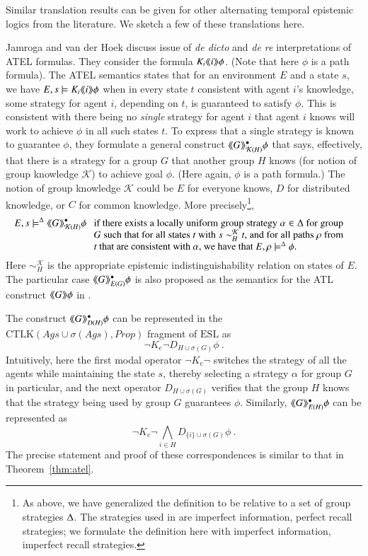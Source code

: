 \documentclass[a4wide]{article}
\newcommand{\CTLK}{\mbox{CTLK}}
\newcommand{\ESL}{\mbox{ESL}}
\newcommand{\Prop}{Prop}
\theoremstyle{examplesty}
\newcommand{\strat}{\sigma}
\newcommand{\Ags}{\mathit{Ags}}
\newcommand{\atlop}[1]{\langle\hspace{-2pt}\langle #1 \rangle \hspace{-2pt}\rangle }
\begin{document}
Similar  translation results can be given for other alternating temporal epistemic logics from the literature. 
We sketch a few of these translations here. 

Jamroga and van der Hoek \cite{JvdH2004} 
discuss issue of \emph{de dicto} and \emph{de re} interpretations of ATEL formulas. They 
consider the formula $K_i\atlop{i} \phi$. 
(Note that here $\phi$ is a path formula). 
The ATEL semantics states that for an environment $E$ and a state 
$s$, we have $E, s\models K_i\atlop{i} \phi$ when in every state $t$ consistent with agent $i$'s knowledge, some strategy for agent $i$, depending on $t$, is guaranteed 
to satisfy $\phi$. This is consistent with there being no  \emph{single} strategy for agent $i$ that agent $i$ knows will work to achieve $\phi$
in all such states $t$. To express that a single strategy is known to guarantee $\phi$, 
they formulate a general construct $\atlop{G}^\bullet_{\mathcal{ K}(H)}\phi$ that says, effectively, that there is a strategy  for a group $G$ that another group $H$
knows (for notion of group knowledge $\mathcal{ K}$) to achieve goal $\phi$. 
(Here again, $\phi$ is a path formula.)
The notion of group knowledge $\mathcal{ K}$ could be $E$ for everyone knows, $D$ for  distributed knowledge, or $C$ for common knowledge. 
More precisely\footnote{As above, we have generalized the definition to be relative to a set of group strategies $\Delta$.
The strategies used in \cite{JvdH2004} are imperfect information, perfect recall strategies; we formulate the definition here with imperfect information, imperfect recall strategies.}, 
\begin{align*}
E, s\models^\GStrats 
\atlop{G}^\bullet_{\mathcal{ K}(H)}\phi 
&~~~ \parbox[t]{3.5in}{if there exists a 
locally 
uniform 
group strategy $\alpha\in \GStrats$ 
for group $G$
such that for all states $t$ with $s \sim_H^\mathcal{ K} t$, 
and  for all paths $\rho$ from $t$ that are consistent with $\alpha$, 
we have that $E,\rho \models^\GStrats \phi$.
} 
\end{align*} 
Here $\sim^\mathcal{ K}_H$ is the appropriate epistemic indistinguishability relation on states of $E$. 
The particular case $\atlop{G}^\bullet_{E(G)}\phi$ is also proposed as the semantics for the ATL construct $\atlop{G} \phi$ in 
\cite{Schobbens2004,Jonker2003,JA07}.  

The construct $\atlop{G}^\bullet_{D(H)}\phi$ can be represented in the 
$\CTLK(\Ags \cup \strat(\Ags) , \Prop)$
fragment of $\ESL$  as 
$$ \neg K_{e} \neg D_{H\cup\strat(G)} \phi~.$$
 Intuitively, here the first modal operator 
$\neg K_e\neg $ 
 switches the strategy of all the agents while maintaining the state $s$,
 thereby selecting a  strategy  $\alpha$ for group $G$ in particular, 
 and the next operator 
$ D_{H \cup \strat(G)}$ 
 verifies that the group $H$ knows  that the strategy 
being 
 used by group $G$ guarantees $\phi$.  Similarly, 
 $\atlop{G}^\bullet_{E(H)}\phi$ can be represented as 
$$ \neg K_{e} \neg \bigwedge_{i\in H} D_{\{i\}\cup\strat(G)} \phi~.$$
The precise statement and  proof of these correspondences is  similar to that in Theorem~\ref{thm:atel}. 
 
\end{document}
